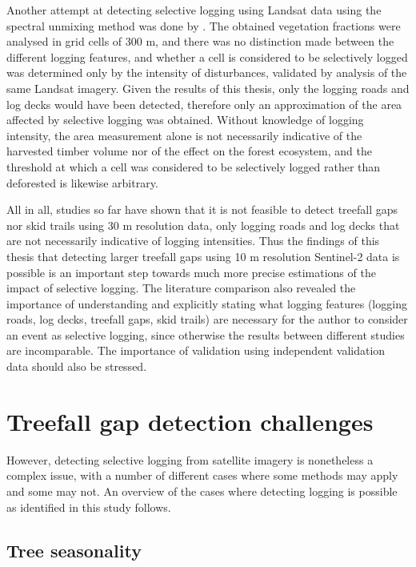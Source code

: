 \documentclass[a4paper,12pt]{scrbook}
\begin{document}
Another attempt at detecting selective logging using Landsat data using the spectral unmixing method was done by \citet{grecchi_integrated_2017}. The obtained vegetation fractions were analysed in grid cells of 300 m, and there was no distinction made between the different logging features, and whether a cell is considered to be selectively logged was determined only by the intensity of disturbances, validated by analysis of the same Landsat imagery. Given the results of this thesis, only the logging roads and log decks would have been detected, therefore only an approximation of the area affected by selective logging was obtained. Without knowledge of logging intensity, the area measurement alone is not necessarily indicative of the harvested timber volume nor of the effect on the forest ecosystem, and the threshold at which a cell was considered to be selectively logged rather than deforested is likewise arbitrary.

All in all, studies so far have shown that it is not feasible to detect treefall gaps nor skid trails using 30 m resolution data, only logging roads and log decks that are not necessarily indicative of logging intensities. Thus the findings of this thesis that detecting larger treefall gaps using 10 m resolution Sentinel-2 data is possible is an important step towards much more precise estimations of the impact of selective logging. The literature comparison also revealed the importance of understanding and explicitly stating what logging features (logging roads, log decks, treefall gaps, skid trails) are necessary for the author to consider an event as selective logging, since otherwise the results between different studies are incomparable. The importance of validation using independent validation data should also be stressed.

\section{Treefall gap detection challenges}

However, detecting selective logging from satellite imagery is nonetheless a complex issue, with a number of different cases where some methods may apply and some may not. An overview of the cases where detecting logging is possible as identified in this study follows.

\subsection{Tree seasonality}
\end{document}

